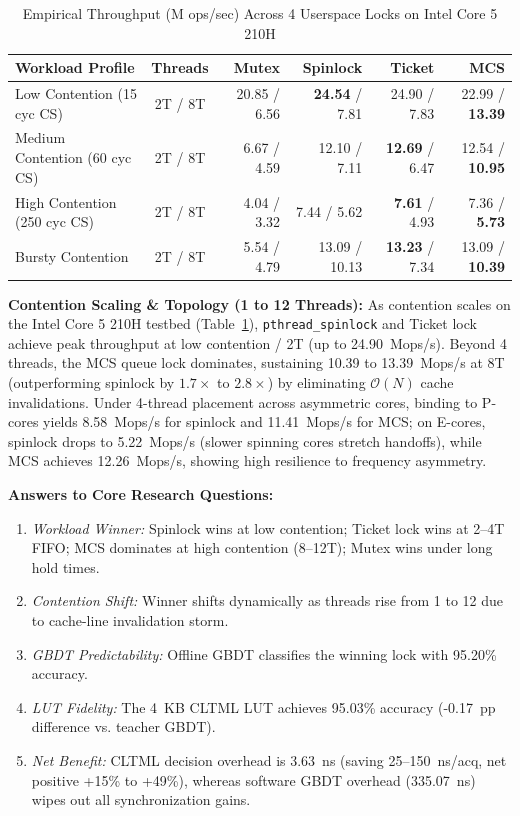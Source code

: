 \documentclass[conference]{IEEEtran}
\begin{document}
\begin{table}[t]
\centering
\caption{Empirical Throughput (M ops/sec) Across 4 Userspace Locks on Intel Core 5 210H}
\label{tab:userspace}
\begin{tabular}{lcrrrr}
\toprule
\textbf{Workload Profile} & \textbf{Threads} & \textbf{Mutex} & \textbf{Spinlock} & \textbf{Ticket} & \textbf{MCS} \\
\midrule
Low Contention (15 cyc CS) & 2T / 8T & 20.85 / 6.56 & \textbf{24.54} / 7.81 & 24.90 / 7.83 & 22.99 / \textbf{13.39} \\
Medium Contention (60 cyc CS) & 2T / 8T & 6.67 / 4.59 & 12.10 / 7.11 & \textbf{12.69} / 6.47 & 12.54 / \textbf{10.95} \\
High Contention (250 cyc CS) & 2T / 8T & 4.04 / 3.32 & 7.44 / 5.62 & \textbf{7.61} / 4.93 & 7.36 / \textbf{5.73} \\
Bursty Contention & 2T / 8T & 5.54 / 4.79 & 13.09 / 10.13 & \textbf{13.23} / 7.34 & 13.09 / \textbf{10.39} \\
\bottomrule
\end{tabular}
\end{table}

\textbf{Contention Scaling \& Topology (1 to 12 Threads):} As contention scales on the Intel Core 5 210H testbed (Table~\ref{tab:userspace}), \texttt{pthread\_spinlock} and Ticket lock achieve peak throughput at low contention / 2T (up to 24.90~Mops/s). Beyond 4 threads, the MCS queue lock dominates, sustaining 10.39 to 13.39~Mops/s at 8T (outperforming spinlock by $1.7\times$ to $2.8\times$) by eliminating $\mathcal{O}(N)$ cache invalidations. Under 4-thread placement across asymmetric cores, binding to P-cores yields 8.58~Mops/s for spinlock and 11.41~Mops/s for MCS; on E-cores, spinlock drops to 5.22~Mops/s (slower spinning cores stretch handoffs), while MCS achieves 12.26~Mops/s, showing high resilience to frequency asymmetry.

\textbf{Answers to Core Research Questions:}
\begin{enumerate}
    \item \textit{Workload Winner:} Spinlock wins at low contention; Ticket lock wins at 2--4T FIFO; MCS dominates at high contention (8--12T); Mutex wins under long hold times.
    \item \textit{Contention Shift:} Winner shifts dynamically as threads rise from 1 to 12 due to cache-line invalidation storm.
    \item \textit{GBDT Predictability:} Offline GBDT classifies the winning lock with 95.20\% accuracy.
    \item \textit{LUT Fidelity:} The 4~KB CLTML LUT achieves 95.03\% accuracy (-0.17~pp difference vs. teacher GBDT).
    \item \textit{Net Benefit:} CLTML decision overhead is 3.63~ns (saving 25--150~ns/acq, net positive +15\% to +49\%), whereas software GBDT overhead (335.07~ns) wipes out all synchronization gains.
\end{enumerate}
\end{document}
